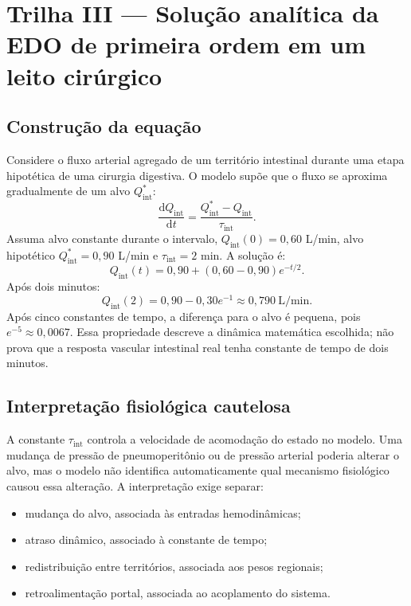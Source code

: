 \documentclass[11pt,a4paper,oneside]{book}
\newcommand{\diff}[2]{\frac{\mathrm{d}#1}{\mathrm{d}#2}}
\begin{document}
\chapter{Trilha III — Solução analítica da EDO de primeira ordem em um leito cirúrgico}

\section{Construção da equação}
Considere o fluxo arterial agregado de um território intestinal durante uma etapa hipotética de uma cirurgia digestiva. O modelo supõe que o fluxo se aproxima gradualmente de um alvo $Q_{\mathrm{int}}^*$:
\begin{equation}
  \diff{Q_{\mathrm{int}}}{t}
  =\frac{Q_{\mathrm{int}}^*-Q_{\mathrm{int}}}{\tau_{\mathrm{int}}}.
  \label{eq:ode-intestine}
\end{equation}
Assuma alvo constante durante o intervalo, $Q_{\mathrm{int}}(0)=0{,}60$ L/min, alvo hipotético $Q_{\mathrm{int}}^*=0{,}90$ L/min e $\tau_{\mathrm{int}}=2$ min. A solução é:
\begin{equation}
Q_{\mathrm{int}}(t)=0{,}90+(0{,}60-0{,}90)e^{-t/2}.
\end{equation}
Após dois minutos:
\[
Q_{\mathrm{int}}(2)=0{,}90-0{,}30e^{-1}
\approx0{,}790\ \mathrm{L/min}.
\]
Após cinco constantes de tempo, a diferença para o alvo é pequena, pois $e^{-5}\approx0{,}0067$. Essa propriedade descreve a dinâmica matemática escolhida; não prova que a resposta vascular intestinal real tenha constante de tempo de dois minutos.

\section{Interpretação fisiológica cautelosa}
A constante $\tau_{\mathrm{int}}$ controla a velocidade de acomodação do estado no modelo. Uma mudança de pressão de pneumoperitônio ou de pressão arterial poderia alterar o alvo, mas o modelo não identifica automaticamente qual mecanismo fisiológico causou essa alteração. A interpretação exige separar:
\begin{itemize}
  \item mudança do alvo, associada às entradas hemodinâmicas;
  \item atraso dinâmico, associado à constante de tempo;
  \item redistribuição entre territórios, associada aos pesos regionais;
  \item retroalimentação portal, associada ao acoplamento do sistema.
\end{itemize}
\end{document}
